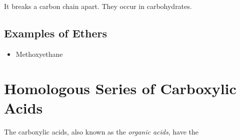 \documentclass[11pt,twoside]{article}
\begin{document}
		
		It breaks a carbon chain apart. They occur in carbohydrates.
		
		\subsection{Examples of Ethers}
			\begin{itemize}
				\item{ Methoxyethane  }
			\end{itemize}
			
	\section{Homologous Series of Carboxylic Acids}
		The carboxylic acids, also known as the \emph{organic acids}, have the 
\end{document}
